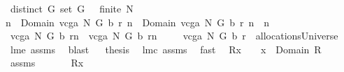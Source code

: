 \begin{isabellebody}
\ {\isachardoublequoteopen}distinct\ G{\isachardoublequoteclose}\ {\isachardoublequoteopen}set\ G\ {\isasymnoteq}\ {\isacharbraceleft}{\isacharbraceright}{\isachardoublequoteclose}\ {\isachardoublequoteopen}finite\ N{\isachardoublequoteclose}\ \ \isanewline
{\isachardoublequoteopen}n{}\ {\isasymin}\ Domain\ {\isacharparenleft}vcga{\isacharprime}\ N\ G\ b\ r{\isacharparenright}{\isachardoublequoteclose}\ {\isachardoublequoteopen}n{}\ {\isasymin}\ Domain\ {\isacharparenleft}vcga{\isacharprime}\ N\ G\ b\ r{\isacharparenright}{\isachardoublequoteclose}\ {\isachardoublequoteopen}n{}\ {\isasymnoteq}\ n{}{\isachardoublequoteclose}\ \isanewline
{}\ {\isachardoublequoteopen}{\isacharparenleft}vcga{\isacharprime}\ N\ G\ b\ r{\isacharparenright}{\isacharcomma}{\isacharcomma}{\isacharcomma}n{}\ {\isasyminter}\ {\isacharparenleft}vcga{\isacharprime}\ N\ G\ b\ r{\isacharparenright}{\isacharcomma}{\isacharcomma}{\isacharcomma}n{}{\isacharequal}{\isacharbraceleft}{\isacharbraceright}{\isachardoublequoteclose}\ \ \isanewline
%
\isadelimproof
%
\endisadelimproof
%
\isatagproof
{}\isamarkupfalse%
\ {\isacharminus}\isanewline
{}\isamarkupfalse%
\ {\isachardoublequoteopen}vcga{\isacharprime}\ N\ G\ b\ r\ {\isasymin}\ allocationsUniverse{\isachardoublequoteclose}\ \isamarkupfalse%
\ lm{}{}e\ assms\ \isamarkupfalse%
\ blast\isanewline
{}\isamarkupfalse%
\ \isamarkupfalse%
\ {\isacharquery}thesis\ \isamarkupfalse%
\ lm{}{}c\ assms\ \isamarkupfalse%
\ fast\isanewline
{}\isamarkupfalse%
%
\endisatagproof
{\isafoldproof}%
%
\isadelimproof
\isanewline
%
\endisadelimproof
\isanewline
{}\isamarkupfalse%
\ \ {\isachardoublequoteopen}R{\isacharcomma}{\isacharcomma}{\isacharcomma}x\ {\isasymnoteq}\ {\isacharbraceleft}{\isacharbraceright}{\isachardoublequoteclose}\ \ {\isachardoublequoteopen}x\ {\isasymin}\ Domain\ R{\isachardoublequoteclose}%
\isadelimproof
\ %
\endisadelimproof
%
\isatagproof
{}\isamarkupfalse%
\ assms\ \ \isanewline
{}\isamarkupfalse%
\ {\isacharminus}\ \isamarkupfalse%
\ {\isachardoublequoteopen}{\isasymUnion}\ {\isacharparenleft}R{\isacharbackquote}{\isacharbackquote}{\isacharbraceleft}x{\isacharbraceright}{\isacharparenright}\ {\isasymnoteq}\ {\isacharbraceleft}{\isacharbraceright}{\isachardoublequoteclose}\ \isamarkupfalse%

\end{isabellebody}
